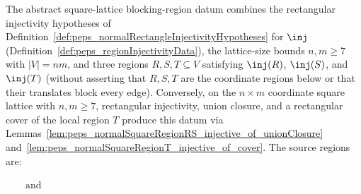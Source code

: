 \begin{definition}%
    \label{def:peps_normalSquareBlockingRegions}
    \leanok
    The abstract square-lattice blocking-region datum combines the rectangular
    injectivity hypotheses of
    Definition~\ref{def:peps_normalRectangleInjectivityHypotheses} for
    $\inj$ (Definition~\ref{def:peps_regionInjectivityData}), the lattice-size
    bounds $n,m\ge 7$ with $|V|=nm$, and three regions $R,S,T\subseteq V$
    satisfying $\inj(R)$, $\inj(S)$, and $\inj(T)$ (without asserting that
    $R,S,T$ are the coordinate regions below or that their translates block
    every edge). Conversely, on the $n\times m$ coordinate square lattice with
    $n,m\ge 7$, rectangular injectivity, union closure, and a rectangular cover
    of the local region $T$ produce this datum via
    Lemmas~\ref{lem:peps_normalSquareRegionRS_injective_of_unionClosure}
    and~\ref{lem:peps_normalSquareRegionT_injective_of_cover}.
    The source regions are:
    \begin{tenkzequation}
        \tenkzkernel
        \begin{tenkz}[rows={ket,ket,ket,ket,ket}, cols=5,
                west=open, east=open, north=open, south=open]
        \end{tenkz}
        $\qquad\text{and}\qquad$
        \begin{tenkz}[rows={ket,ket,ket,ket,ket}, cols=5,
                west=open, east=open, north=open, south=open]

\end{tenkz}
\end{tenkzequation}
\end{definition}
